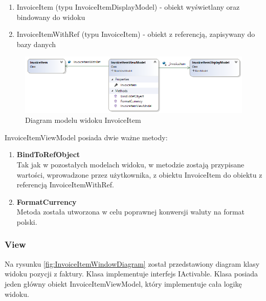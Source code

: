 \begin{enumerate}
    \item InvoiceItem (typu InvoiceItemDisplayModel) - obiekt wyświetlany oraz bindowany do widoku
    \item InvoiceItemWithRef (typu InvoiceItem) - obiekt z referencją, zapisywany do bazy danych
\end{enumerate}

\begin{figure}[ht!]
  \includegraphics[width=\linewidth]{Rysunki/InvoiceItemViewModelDiagram.png}
  \caption{Diagram modelu widoku InvoiceItem}
  \label{fig:InvoiceItemDiagram}
\end{figure}

InvoiceItemViewModel posiada dwie ważne metody:

\begin{enumerate}
    \item \textbf{BindToRefObject} \\
    Tak jak w pozostałych modelach widoku, w metodzie zostają przypisane wartości, wprowadzone przez użytkownika, z obiektu InvoiceItem do obiektu z referencją InvoiceItemWithRef. 
    \item \textbf{FormatCurrency} \\
    Metoda została utworzona w celu poprawnej konwersji waluty na format polski.
\end{enumerate}

\subsubsection{View}
Na rysunku \ref{fig:InvoiceItemWindowDiagram} został przedstawiony diagram klasy widoku pozycji z faktury. Klasa implementuje interfejs IActivable. Klasa posiada jeden główny obiekt InvoiceItemViewModel, który implementuje cała logikę widoku.

